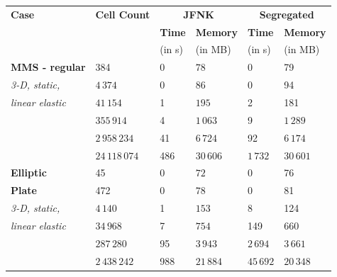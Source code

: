 \documentclass[sn-mathphys,Numbered]{sn-jnl}%
\begin{document}
\begin{table}[!htbp]
	\centering
		\begin{tabular}{ll|ll|ll}
			\hline
			\textbf{Case} & \textbf{Cell Count} & \multicolumn{2}{c|}{\textbf{JFNK}} & \multicolumn{2}{c}{\textbf{Segregated}} \\
			     &            & \textbf{Time} & \textbf{Memory} & \textbf{Time} & \textbf{Memory} \\
			     &            & (in s) & (in MB) & (in s) & (in MB) \\
			\hline 
			\textbf{MMS - regular} & 384 & 0 & $78$ 				& 0 & 79 \\
			\emph{3-D, static,}	& $4\,374$ & 0 & $86$ 			& 0 & 94 \\
			\emph{linear elastic} & $41\,154$ & 1 & $195$  		& 2 & 181 \\
				&  $355\,914$ & 4 & $1\,063$ 		& 9 & $1\,289$ \\
				& $2\,958\,234$ & 41 & $6\,724$ 	& 92 & $6\,174$ \\
				& $24\,118\,074$ & 486 & $30\,606$ & $1\,732$ & $30\,601$ \\
			\hline
			\textbf{Elliptic} & 45 & 0 & $72$ & 0 & 76 \\
			\textbf{Plate} & 472 & 0 & $78$ & 0 & 81 \\
			\emph{3-D, static,} & $4\,140$ & 1 & $153$ & 8 & 124 \\
			\emph{linear elastic} & $34\,968$ & 7 & $754$ & 149 & 660 \\
				& $287\,280$ & 95 & $3\,943$ & $2\,694$ & $3\,661$ \\
				& $2\,438\,242$ & 988 & $21\,884$ & $45\,692$ & $20\,348$ \\
			\hline

\end{tabular}
\end{table}
\end{document}
